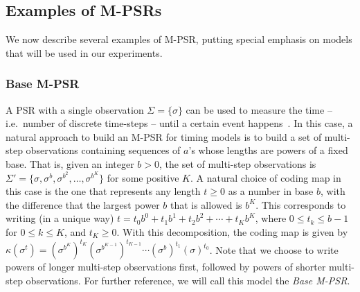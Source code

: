 \subsection{Examples of M-PSRs}

We now describe several examples of M-PSR, putting special emphasis on models that will be used in our experiments.

\subsubsection{Base M-PSR}
A PSR with a single observation $\Sigma = \{\sigma\}$ can be used to measure the time -- i.e.\ number of discrete time-steps -- until a certain event happens~\cite{ODM}. In this case, a natural approach to build an M-PSR for timing models is to build a set of multi-step observations containing sequences of $a$'s whose lengths are powers of a fixed base. That is, given an integer $b > 0$, the set of multi-step observations is $\Sigma' = \{\sigma,\sigma^b, \sigma^{b^2}, \ldots, \sigma^{b^K}\}$ for some positive $K$. A natural choice of coding map in this case is the one that represents any length $t \geq 0$ as a number in base $b$, with the difference that the largest power $b$ that is allowed is $b^K$. This corresponds to writing (in a unique way) $t = t_0 b^0 + t_1 b^1 + t_2 b^2 + \cdots + t_K b^K$, where $0 \leq t_k \leq b - 1$ for $0 \leq k \leq K$, and $t_K \geq 0$. With this decomposition, the coding map is given by $\kappa(\sigma^t) = (\sigma^{b^K})^{t_K} (\sigma^{b^{K-1}})^{t_{K-1}} \cdots (\sigma^b)^{t_1} (\sigma)^{t_0}$. Note that we choose to write powers of longer multi-step observations first, followed by powers of shorter multi-step observations. For further reference, we will call this model the \emph{Base M-PSR}.

